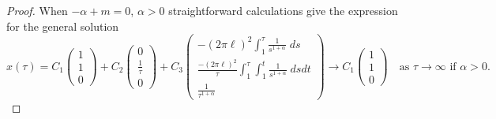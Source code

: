 \documentclass[a4paper,11pt]{article}
\def\k{(2\pi \ell)}
\theoremstyle{remark}
\begin{document}
\begin{proof}
When $-\alpha+m=0$, $\alpha>0$ straightforward calculations give the expression for the general solution
$$x(\tau) = C_1 \begin{pmatrix} 1\\ 1\\0\end{pmatrix} + C_2 \begin{pmatrix} 0 \\ \frac{1}{\tau} \\0 \end{pmatrix} + C_3 \begin{pmatrix} -\k^2 \int_1^\tau \frac{1}{s^{1+\alpha}}\; ds \\ \frac{-\k^2}{\tau}\int_1^\tau  \int_1^t \frac{1}{s^{1+\alpha}}\; ds dt\\ \frac{1}{\tau^{1+\alpha}} \end{pmatrix}  \rightarrow C_1 \begin{pmatrix} 1\\ 1\\0\end{pmatrix}\quad \text{as $\tau \rightarrow \infty$ if $\alpha>0$.}$$


\end{proof}
\end{document}
